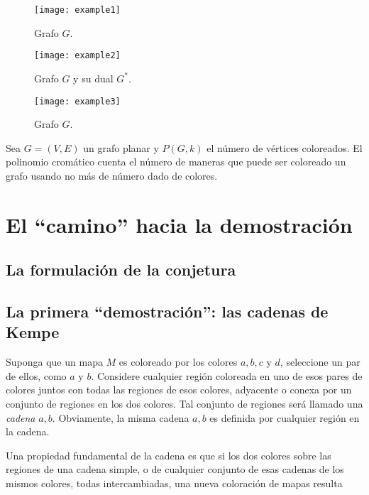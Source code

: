 \documentclass[3p,times,a4paper,twocolumn,authoryear]{elsarticle} %
\begin{document}
\begin{figure}[H]
\centering
\texttt{[image: example1]}
\caption{Grafo $G$.}
\end{figure}

\begin{figure}[H]
	\centering
	\texttt{[image: example2]}
	\caption{Grafo $G$ y su dual $G^{\ast}$.}
\end{figure}

\begin{figure}[H]
	\centering
	\texttt{[image: example3]}
	\caption{Grafo $G$.}
\end{figure}

\begin{definition}

Sea $G=(V,E)$ un grafo planar y $P(G,k)$ el número de vértices coloreados.
El polinomio cromático cuenta el número de maneras que puede ser coloreado un grafo usando no más de número dado de colores.

\end{definition}

\section{El ``camino'' hacia la demostración}\label{sec:3}

\subsection{La formulación de la conjetura}\label{sec:3.1}

\subsection{La primera ``demostración'': las cadenas de Kempe}\label{sec:3.2}

\begin{definition}
	
	Suponga que un mapa $M$ es coloreado por los colores $a, b, c$ y $d$, seleccione un par de ellos, como $a$ y $b$. Considere cualquier región coloreada en uno de esos pares de colores juntos con todas las regiones de esos colores, adyacente o conexa por un conjunto de regiones en los dos colores. Tal conjunto de regiones será llamado una \emph{cadena} $a,b$. Obviamente, la misma cadena $a,b$ es definida por cualquier región en la cadena.
	
	Una propiedad fundamental de la cadena es que si los dos colores sobre las regiones de una cadena simple, o de cualquier conjunto de esas cadenas de los mismos colores, todas intercambiadas, una nueva coloración de mapas resulta
	
\end{definition}
\end{document}
